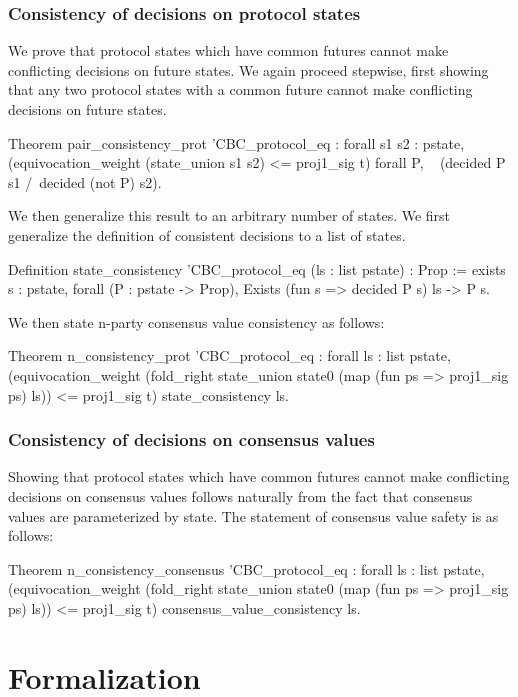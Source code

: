 \documentclass[runningheads]{llncs}
\begin{document}
\subsubsection{Consistency of decisions on protocol states}
We prove that protocol states which have common futures cannot make conflicting decisions on future states. We again proceed stepwise, first showing that any two protocol states with a common future cannot make conflicting decisions on future states. 
\begin{coq}
Theorem pair_consistency_prot '{CBC_protocol_eq} :
	forall s1 s2 : pstate,
	(equivocation_weight (state_union s1 s2) <= proj1_sig t)%
	forall P, 
	~ (decided P s1 /\ decided (not P) s2).
\end{coq}
We then generalize this result to an arbitrary number of states. We first generalize the definition of consistent decisions to a list of states. 
\begin{coq}
Definition state_consistency '{CBC_protocol_eq} 
															(ls : list pstate) : Prop :=
	exists s : pstate,
	forall (P : pstate -> Prop),
	Exists (fun s => decided P s) ls ->
	P s.
\end{coq}
We then state n-party consensus value consistency as follows: 
\begin{coq}
Theorem n_consistency_prot '{CBC_protocol_eq} :
	forall ls : list pstate,
	(equivocation_weight (fold_right state_union state0 
	(map (fun ps => proj1_sig ps) ls)) <= proj1_sig t)%
	state_consistency ls.
\end{coq}

\subsubsection{Consistency of decisions on consensus values} 
Showing that protocol states which have common futures cannot make conflicting decisions on consensus values follows naturally from the fact that consensus values are parameterized by state. The statement of consensus value safety is as follows: 
\begin{coq}
Theorem n_consistency_consensus '{CBC_protocol_eq} :
	forall ls : list pstate,
	(equivocation_weight (fold_right state_union state0 
	(map (fun ps => proj1_sig ps) ls)) <= proj1_sig t)%
	consensus_value_consistency ls. 
\end{coq}

\section{Formalization}
\end{document}
